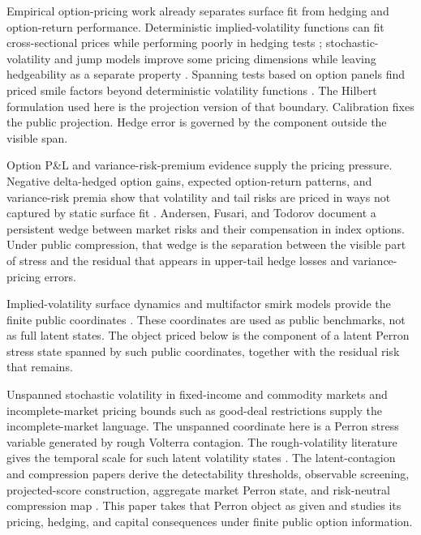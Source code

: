 \documentclass[11pt,a4paper]{amsart}
\theoremstyle{plain}
\theoremstyle{definition}
\theoremstyle{remark}
\begin{document}
Empirical option-pricing work already separates surface fit from hedging and option-return
performance.  Deterministic implied-volatility functions can fit cross-sectional prices while
performing poorly in hedging tests \cite{dumasFlemingWhaley1998}; stochastic-volatility and jump
models improve some pricing dimensions while leaving hedgeability as a separate property
\cite{bakshiCaoChen1997,pan2002}.  Spanning tests based on option panels find priced smile factors
beyond deterministic volatility functions \cite{buraschiJackwerth2001}.  The Hilbert formulation
used here is the projection version of that boundary.  Calibration fixes the public projection.
Hedge error is governed by the component outside the visible span.

Option P\&L and variance-risk-premium evidence supply the pricing pressure.  Negative
delta-hedged option gains, expected option-return patterns, and variance-risk premia show that
volatility and tail risks are priced in ways not captured by static surface fit
\cite{covalShumway2001,bakshiKapadia2003,jones2006,carrWu2009,
bollerslevTauchenZhou2009}.  Andersen, Fusari, and Todorov
\cite{andersenFusariTodorov2015} document a persistent wedge between market risks and their
compensation in index options.  Under public compression, that wedge is the separation between the
visible part of stress and the residual that appears in upper-tail hedge losses and
variance-pricing errors.

Implied-volatility surface dynamics and multifactor smirk models provide the finite public
coordinates \cite{contDaFonseca2002,christoffersenHestonJacobs2009}.  These coordinates are used as
public benchmarks, not as full latent states.  The object priced below is the component of a latent
Perron stress state spanned by such public coordinates, together with the residual risk that
remains.

Unspanned stochastic volatility in fixed-income and commodity markets
\cite{collinDufresneGoldstein2002,trolleSchwartz2009} and incomplete-market pricing bounds such as
good-deal restrictions \cite{cochraneSaaRequejo2000} supply the incomplete-market language.  The
unspanned coordinate here is a Perron stress variable generated by rough Volterra contagion.  The
rough-volatility literature gives the temporal scale for such latent volatility states
\cite{bayerFrizGatheral2016,gatheralJaissonRosenbaum2018}.  The latent-contagion and compression
papers derive the detectability thresholds, observable screening, projected-score construction,
aggregate market Perron state, and risk-neutral compression map
\cite{vidal2026latent,vidal2026dynamic,vidal2026econometric,vidal2026market,
vidal2026compression}.  This paper takes that Perron object as given and studies its pricing,
hedging, and capital consequences under finite public option information.
\end{document}
